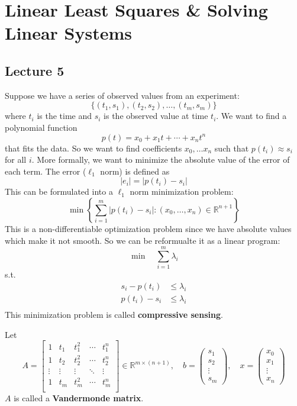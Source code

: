 \newpage
\section{Linear Least Squares \& Solving Linear Systems}
\subsection{Lecture 5}
\begin{problem}
  Suppose we have a series of observed values from an experiment:
  $$\{(t_1, s_1), (t_2, s_2),\ldots, (t_m,s_m)\}$$ where $t_i$ is the time and $s_i$ is the observed value at time $t_i$. We want to find a polynomial function $$p(t) = x_0 + x_1t + \cdots + x_nt^n$$ that fits the data. So we want to find coefficients $x_0,\ldots x_n$ such that $p(t_i) \approx s_i$ for all $i$. More formally, we want to minimize the absolute value of the error of each term. The error ($\ell_1$ norm) is defined as $$|e_i| = |p(t_i) - s_i|$$ This can be formulated into a $\ell_1$ norm minimization problem:$$\min \left\{\sum^m_{i=1}|p(t_i) - s_i| : (x_0,\ldots,x_n) \in \mathbb R^{n+1}\right\}$$ This is a non-differentiable optimization problem since we have absolute values which make it not smooth. So we can be reformualte it as a linear program:
  $$\min \quad \sum^m_{i=1}\lambda_i$$
  s.t.
  \begin{align*}
    s_i - p(t_i) &\leq \lambda_i \tag*{for all $i = 1,\ldots,m$}\\
    p(t_i) - s_i &\leq \lambda_i \tag*{for all $i = 1,\ldots,m$}\\
  \end{align*}
  This minimization problem is called \textbf{compressive sensing}.
\end{problem}
\begin{definition}
  Let $$A = \begin{bmatrix}
    1 & t_1 & t_1^2 & \cdots & t_1^n\\
    1 & t_2 & t_2^2 & \cdots & t_2^n\\
    \vdots & \vdots & \vdots & \ddots & \vdots\\
    1 & t_m & t_m^2 & \cdots & t_m^n\\
  \end{bmatrix} \in \mathbb R^{m \times (n+1)}, \quad b = \begin{pmatrix}
    s_1 \\ s_2 \\ \vdots \\ s_m
  \end{pmatrix}, \quad x = \begin{pmatrix}
    x_0 \\ x_1 \\ \vdots \\ x_n
  \end{pmatrix}$$
  $A$ is called a \textbf{Vandermonde matrix}.
\end{definition}
